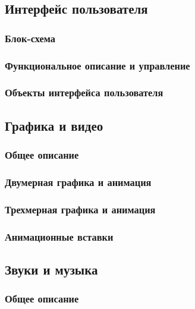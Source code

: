 \documentclass{article}
\begin{document}
\subsection{Интерфейс пользователя}

\subsubsection{Блок-схема}

\subsubsection{Функциональное описание и управление}

\subsubsection{Объекты интерфейса пользователя}

\subsection{Графика и видео}

\subsubsection{Общее описание}

\subsubsection{Двумерная графика и анимация}

\subsubsection{Трехмерная графика и анимация}

\subsubsection{Анимационные вставки}

\subsection{Звуки и музыка}

\subsubsection{Общее описание}
\end{document}
